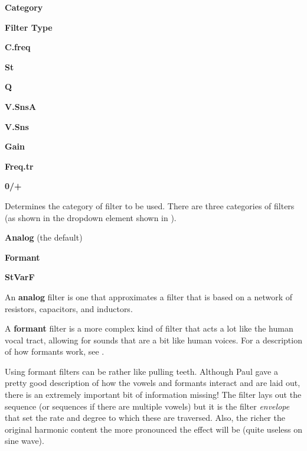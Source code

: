    \begin{enumber}
      \item \textbf{Category}
      \item \textbf{Filter Type}
      \item \textbf{C.freq}
      \item \textbf{St}
      \item \textbf{Q}
      \item \textbf{V.SnsA}
      \item \textbf{V.Sns}
      \item \textbf{Gain}
      \item \textbf{Freq.tr}
      \item \textbf{0/+}
   \end{enumber}

   \setcounter{ItemCounter}{0}      %

   Determines the category of filter to be used.
   There are three categories of filters
   (as shown in the dropdown element shown in
   ).

\begin{enumber}                     %
   \item \textbf{Analog} (the default)
   \item \textbf{Formant}
   \item \textbf{StVarF}
\end{enumber}

   An \textbf{analog} filter
   is one that approximates a filter that is based on
   a network of resistors, capacitors, and inductors.

   A \textbf{formant} filter
   is a more complex kind of filter that acts a lot
   like the human vocal tract, allowing for sounds that
   are a bit like human voices.  For a description of how formants work,
   see .

   Using formant filters can be rather like pulling teeth.  Although Paul gave
   a pretty good description of how the vowels and formants interact and are
   laid out, there is an extremely important bit of information missing!  The
   filter lays out the sequence (or sequences if there are multiple vowels) but
   it is the filter \textsl{envelope} that set the rate and degree to which
   these are traversed. Also, the richer the original harmonic content the more
   pronounced the effect will be (quite useless on sine wave).

